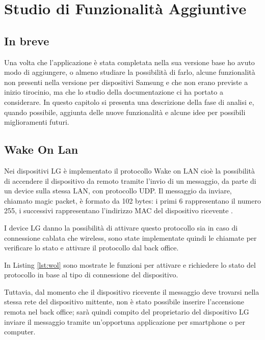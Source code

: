 \chapter{Studio di Funzionalità Aggiuntive}\label{aggiunte}

\section{In breve}
Una volta che l'applicazione è stata completata nella sua versione base ho avuto modo di aggiungere, o almeno studiare la possibilità di farlo, alcune funzionalità non presenti nella versione per dispositivi Samsung e che non erano previste a inizio tirocinio, ma che lo studio della documentazione ci ha portato a considerare.
In questo capitolo si presenta una descrizione della fase di analisi e, quando possibile, aggiunta delle nuove funzionalità e alcune idee per possibili miglioramenti futuri.

\section{Wake On Lan}

Nei dispositivi LG è implementato il protocollo Wake on LAN cioè la possibilità di accendere il dispositivo da remoto tramite l'invio di un messaggio, da parte di un device sulla stessa LAN, con protocollo UDP.
Il messaggio da inviare, chiamato magic packet, è formato da 102 bytes: i primi 6 rappresentano il numero 255, i successivi rappresentano l'indirizzo MAC del dispositivo ricevente \cite{wol}.

I device LG danno la possibilità di attivare questo protocollo sia in caso di connessione cablata che wireless, sono state implementate quindi le chiamate per verificare lo stato e attivare il protocollo dal back office.

In Listing \ref*{lst:wol} sono mostrate le funzioni per attivare e richiedere lo stato del protocollo in base al tipo di connessione del dispositivo.



Tuttavia, dal momento che il dispositivo ricevente il messaggio deve trovarsi nella stessa rete del dispositivo mittente, non è stato possibile inserire l'accensione remota nel back office; sarà quindi compito del proprietario del dispositivo LG inviare il messaggio tramite un'opportuna applicazione per smartphone o per computer.

